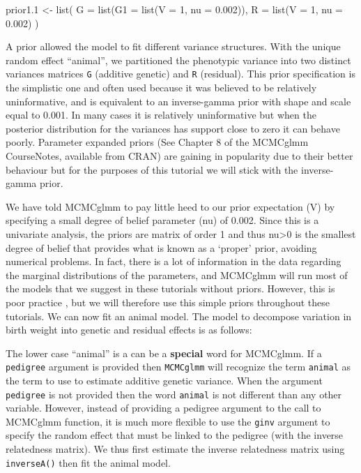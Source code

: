 \documentclass[
  12pt,
]{book}
\newenvironment{Shaded}{\begin{snugshade}}{\end{snugshade}}
\newcommand{\AttributeTok}[1]{\textcolor[rgb]{0.77,0.63,0.00}{#1}}
\newcommand{\DecValTok}[1]{\textcolor[rgb]{0.00,0.00,0.81}{#1}}
\newcommand{\FloatTok}[1]{\textcolor[rgb]{0.00,0.00,0.81}{#1}}
\newcommand{\FunctionTok}[1]{\textcolor[rgb]{0.00,0.00,0.00}{#1}}
\newcommand{\NormalTok}[1]{#1}
\newcommand{\OtherTok}[1]{\textcolor[rgb]{0.56,0.35,0.01}{#1}}
\begin{document}
\begin{Shaded}
\begin{Highlighting}[]
\NormalTok{prior1}\FloatTok{.1} \OtherTok{\textless{}{-}} \FunctionTok{list}\NormalTok{(}
  \AttributeTok{G =} \FunctionTok{list}\NormalTok{(}\AttributeTok{G1 =} \FunctionTok{list}\NormalTok{(}\AttributeTok{V =} \DecValTok{1}\NormalTok{, }\AttributeTok{nu =} \FloatTok{0.002}\NormalTok{)),}
  \AttributeTok{R =} \FunctionTok{list}\NormalTok{(}\AttributeTok{V =} \DecValTok{1}\NormalTok{, }\AttributeTok{nu =} \FloatTok{0.002}\NormalTok{)}
\NormalTok{)}
\end{Highlighting}
\end{Shaded}

A prior allowed the model to fit different variance structures. With the unique random effect ``animal'', we partitioned the phenotypic variance into two distinct variances matrices \texttt{G} (additive genetic) and \texttt{R} (residual).
This prior specification is the simplistic one and often used because it was believed to be relatively uninformative, and is equivalent to an inverse-gamma prior with shape and scale equal to 0.001. In many cases it is relatively uninformative but when the posterior distribution for the variances has support close to zero it can behave poorly. Parameter expanded priors (See Chapter 8 of the MCMCglmm CourseNotes, available from CRAN) are gaining in popularity due to their better behaviour but for the purposes of this tutorial we will stick with the inverse-gamma prior.

We have told MCMCglmm to pay little heed to our prior expectation (V) by specifying a small degree of belief parameter (nu) of 0.002. Since this is a univariate analysis, the priors are matrix of order 1 and thus nu\textgreater0 is the smallest degree of belief that provides what is known as a `proper' prior, avoiding numerical problems. In fact, there is a lot of information in the data regarding the marginal distributions of the parameters, and MCMCglmm will run most of the models that we suggest in these tutorials without priors. However, this is poor practice , but we will therefore use this simple priors throughout these tutorials. We can now fit an animal model. The model to decompose variation in birth weight into genetic and residual effects is as follows:

The lower case ``animal'' is a can be a \textbf{special} word for MCMCglmm. If a \texttt{pedigree} argument is provided then \texttt{MCMCglmm} will recognize the term \texttt{animal} as the term to use to estimate additive genetic variance. When the argument \texttt{pedigree} is not provided then the word \texttt{animal} is not different than any other variable. However, instead of providing a pedigree argument to the call to MCMCglmm function, it is much more flexible to use the \texttt{ginv} argument to specify the random effect that must be linked to the pedigree (with the inverse relatedness matrix). We thus first estimate the inverse relatedness matrix using \texttt{inverseA()} then fit the animal model.
\end{document}
